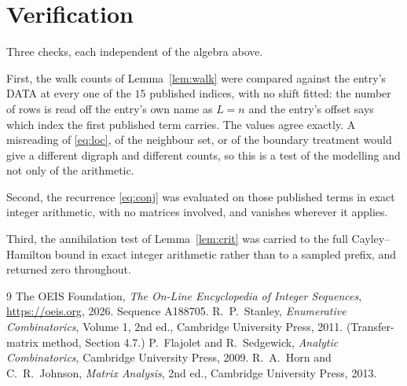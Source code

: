 \documentclass[11pt,a4paper]{article}
\theoremstyle{plain}
\theoremstyle{definition}
\begin{document}
\section{Verification}

Three checks, each independent of the algebra above.

First, the walk counts of Lemma~\ref{lem:walk} were compared against the entry's DATA at
every one of the $15$ published indices, with no shift fitted: the number of rows is
read off the entry's own name as $L=n$ and the entry's offset says which index the first
published term carries. The values agree exactly. A misreading of \eqref{eq:loc}, of the
neighbour set, or of the boundary treatment would give a different digraph and different
counts, so this is a test of the modelling and not only of the arithmetic.

Second, the recurrence \eqref{eq:conj} was evaluated on those published terms in exact
integer arithmetic, with no matrices involved, and vanishes wherever it applies.

Third, the annihilation test of Lemma~\ref{lem:crit} was carried to the full
Cayley--Hamilton bound in exact integer arithmetic rather than to a sampled prefix, and
returned zero throughout.

\begin{thebibliography}{9}
 The OEIS Foundation, \emph{The On-Line Encyclopedia of Integer
Sequences}, \url{https://oeis.org}, 2026. Sequence A188705.
 R.~P.~Stanley, \emph{Enumerative Combinatorics}, Volume 1, 2nd ed.,
Cambridge University Press, 2011. (Transfer-matrix method, Section 4.7.)
 P.~Flajolet and R.~Sedgewick, \emph{Analytic Combinatorics}, Cambridge
University Press, 2009.
 R.~A.~Horn and C.~R.~Johnson, \emph{Matrix Analysis}, 2nd ed., Cambridge
University Press, 2013.
\end{thebibliography}
\end{document}
